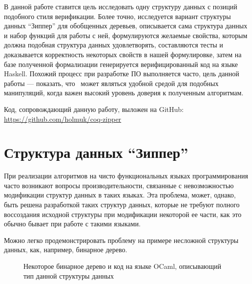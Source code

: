 В данной работе ставится цель исследовать одну структуру данных с позиций подобного стиля верификации. Более точно, исследуется вариант структуры данных ``Зиппер'' для обобщенных деревьев, описывается сама структура данных и набор функций для работы с ней, формулируются желаемые свойства, которым должна подобная структура данных удовлетворять, составляются тесты и доказывается корректность некоторых свойств в нашей формулировке, затем на базе полученной формализации генерируется верифицированный код на языке Haskell. Похожий процесс при разработке ПО выполняется часто, цель данной работы --- показать, что \tcoq~может являться удобной средой для подобных манипуляций, когда важен высокий уровень доверия к полученным алгоритмам.

Код, сопровождающий данную работу, выложен на GitHub: \url{https://github.com/holmuk/coq-zipper}

\newpage

\section{Структура данных ``Зиппер''}

При реализации алгоритмов на чисто функциональных языках программирования часто возникают вопросы производительности, связанные с невозможностью модификации структур данных в таких языках. Эта проблема, может, однако, быть решена разработкой таких структур данных, которые не требуют полного воссоздания исходной структуры при модификации некоторой ее части, как это обычно бывает при работе с такими языками.

Можно легко продемонстрировать проблему на примере несложной структуры данных, как, например, бинарное дерево. 

\begin{figure}[H]
\centering


\caption{Некоторое бинарное дерево и код на языке OCaml, описывающий тип данной структуры данных}
\end{figure}

